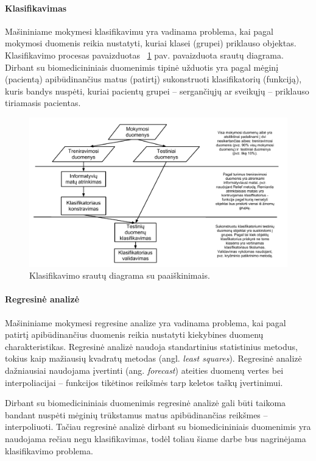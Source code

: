 \paragraph{Klasifikavimas}

Mašininiame mokymesi klasifikavimu yra vadinama problema, kai pagal mokymosi duomenis reikia nustatyti, kuriai klasei (grupei) priklauso objektas. Klasifikavimo procesas pavaizduotas ~\ref{fig:classification_process} pav. pavaizduota srautų diagrama. Dirbant su biomedicininiais duomenimis tipinė užduotis yra pagal mėginį (pacientą) apibūdinančius matus (patirtį) sukonstruoti klasifikatorių (funkciją), kuris bandys nuspėti, kuriai pacientų grupei -- sergančiųjų ar sveikųjų -- priklauso tiriamasis pacientas.
\begin{figure}
 \centering
 \includegraphics[width=\textwidth]{images/classification_process.pdf}
 \caption{Klasifikavimo srautų diagrama su paaiškinimais.}
 \label{fig:classification_process}
\end{figure}

\paragraph{Regresinė analizė}

Mašininiame mokymesi regresine analize yra vadinama problema, kai pagal patirtį apibūdinančius duomenis reikia nustatyti kiekybines duomenų charakteristikas. Regresinė analizė naudoja standartinius statistinius metodus, tokius kaip mažiausių kvadratų metodas (angl. \textit{least squares}). Regresinė analizė dažniausiai naudojama įvertinti (ang. \textit{forecast}) ateities duomenų vertes bei interpoliacijai -- funkcijos tikėtinos reikšmės tarp keletos taškų įvertinimui. 

Dirbant su biomedicininiais duomenimis regresinė analizė gali būti taikoma bandant nuspėti mėginių trūkstamus matus apibūdinančias reikšmes -- interpoliuoti. Tačiau regresinė analizė dirbant su biomedicininiais duomenimis yra naudojama rečiau negu klasifikavimas, todėl toliau šiame darbe bus nagrinėjama klasifikavimo problema.

